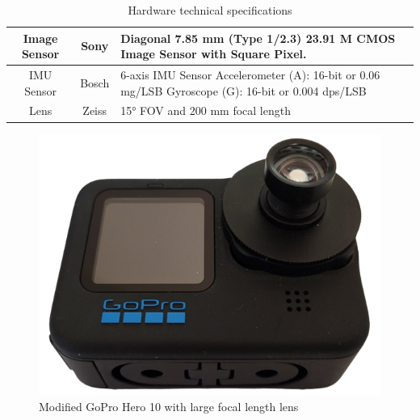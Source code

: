 \begin{table}[H]
    \centering
\begin{tabular}{ c| c | L }

     Image Sensor & 
     Sony & 
     Diagonal 7.85 mm (Type 1/2.3) 23.91 M CMOS Image Sensor with Square Pixel. \\
     \hline
     
     IMU Sensor & 
     Bosch & 
     6-axis IMU Sensor
     Accelerometer (A): 16-bit or 0.06 mg/LSB 
     Gyroscope (G): 16-bit or 0.004 dps/LSB  \\
     \hline
     
     Lens & 
     Zeiss & 
     15° FOV and 200 mm focal length \\

\end{tabular}
    \caption{Hardware technical specifications}
    \label{tab:technical_details}
\end{table}

\begin{figure}[H]
    \centering
    \includegraphics[scale=0.25]{images/fig_chapter4/mod_gorpro_hero_10.png}
    \caption{Modified GoPro Hero 10 with large focal length lens}
    \label{fig:mod_gopro_hero10}
\end{figure}

